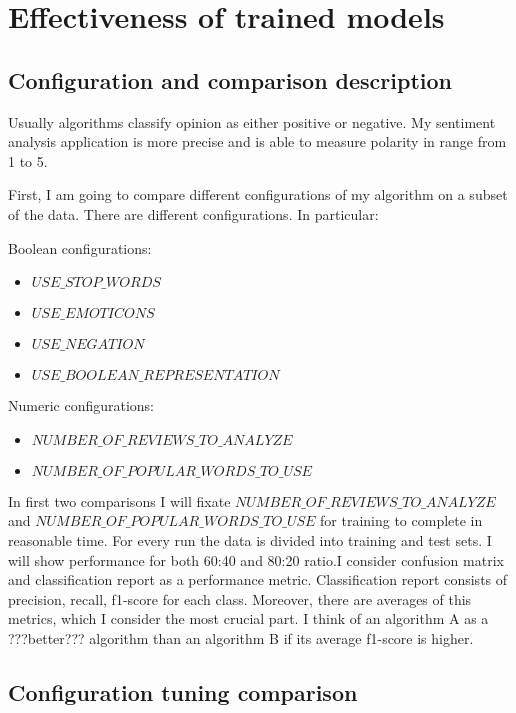 \documentclass[12pt]{report}
\begin{document}
\newpage

\chapter{Effectiveness of trained models}

\section{Configuration and comparison description}

Usually algorithms classify opinion as either positive or negative. My sentiment analysis application is more precise and is able to measure polarity in range from 1 to 5.

First, I am going to compare different configurations of my algorithm on a subset of the data. There are different configurations. In particular:

Boolean configurations:
\begin{itemize}  
	\item $USE\_STOP\_WORDS$
	\item $USE\_EMOTICONS$
	\item $USE\_NEGATION$ 
	\item $USE\_BOOLEAN\_REPRESENTATION$
\end{itemize}


Numeric configurations:
\begin{itemize}  
	\item $NUMBER\_OF\_REVIEWS\_TO\_ANALYZE$
	\item $NUMBER\_OF\_POPULAR\_WORDS\_TO\_USE$
\end{itemize}

In first two comparisons I will fixate $NUMBER\_OF\_REVIEWS\_TO\_ANALYZE$ and $NUMBER\_OF\_POPULAR\_WORDS\_TO\_USE$ for training to complete in reasonable time. For every run the data is divided into training and test sets. I will show performance for both 60:40 and 80:20 ratio.I consider confusion matrix and classification report as a performance metric. Classification report consists of precision, recall, f1-score for each class. Moreover, there are averages of this metrics, which I consider the most crucial part. I think of an algorithm A as a ???better??? algorithm than an algorithm B if its average f1-score is higher.

\newpage

\section{Configuration tuning comparison}
\end{document}
